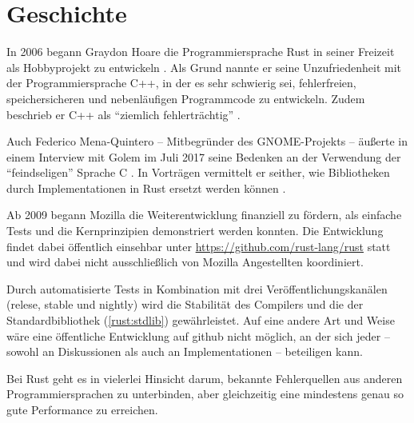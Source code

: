  \cite{rust:orly_y_rust}


\section{Geschichte}
\label{rust:history}

In 2006 begann Graydon Hoare die Programmiersprache Rust in seiner Freizeit als Hobbyprojekt zu entwickeln \cite{rust:faq}.
Als Grund nannte er seine Unzufriedenheit mit der Programmiersprache C++, in der es sehr schwierig sei, fehlerfreien, speichersicheren und nebenläufigen Programmcode zu entwickeln.
Zudem beschrieb er C++ als \enquote{ziemlich fehlerträchtig} \cite{rust:heise_interview_graydon}.

Auch Federico Mena-Quintero -- Mitbegründer des GNOME-Projekts  --
äußerte in einem Interview mit Golem im Juli 2017 seine Bedenken an der Verwendung der \enquote{feindseligen} Sprache C \cite{rust:c_is_hostile_golem}.
In Vorträgen  vermittelt er seither, wie Bibliotheken durch Implementationen in Rust ersetzt werden können \cite{rust:c_is_hostile_mena}.

Ab 2009 begann Mozilla die Weiterentwicklung finanziell zu fördern, als einfache Tests und die Kernprinzipien demonstriert werden konnten.
Die Entwicklung findet dabei öffentlich einsehbar unter \url{https://github.com/rust-lang/rust} statt und wird dabei nicht ausschließlich von Mozilla Angestellten koordiniert.

Durch automatisierte Tests  in Kombination mit drei Veröffentlichungskanälen (relese, stable und nightly) wird die Stabilität des Compilers und die der Standardbibliothek (\autoref{rust:stdlib}) gewährleistet.
Auf eine andere Art und Weise wäre eine öffentliche Entwicklung auf \gls{github} nicht möglich, an der sich jeder -- sowohl an Diskussionen als auch an Implementationen -- beteiligen kann.


Bei Rust geht es in vielerlei Hinsicht darum, bekannte Fehlerquellen aus anderen Programmiersprachen zu unterbinden, aber gleichzeitig eine mindestens genau so gute Performance zu erreichen.


